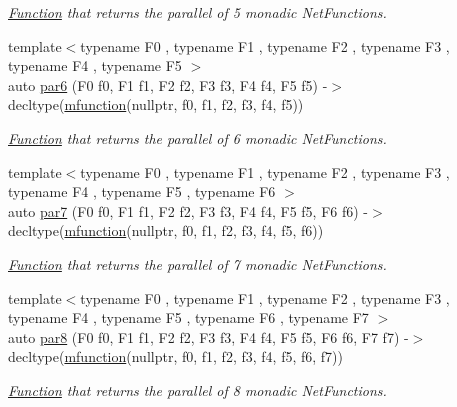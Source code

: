 \begin{DoxyCompactItemize}
\begin{DoxyCompactList}\small\item\em \hyperlink{structpfq_1_1lang_1_1Function}{Function} that returns the parallel of 5 monadic Net\+Functions. \end{DoxyCompactList}\item 
{\footnotesize template$<$typename F0 , typename F1 , typename F2 , typename F3 , typename F4 , typename F5 $>$ }\\auto \hyperlink{namespacepfq_1_1lang_1_1experimental_1_1anonymous__namespace_02experimental_8hpp_03_a01264553d41dccee4e8d1fe433f40270}{par6} (F0 f0, F1 f1, F2 f2, F3 f3, F4 f4, F5 f5) -\/$>$ decltype(\hyperlink{namespacepfq_1_1lang_a1aacba4a159b6c2ddf275bd1fec19ec2}{mfunction}(nullptr, f0, f1, f2, f3, f4, f5))
\begin{DoxyCompactList}\small\item\em \hyperlink{structpfq_1_1lang_1_1Function}{Function} that returns the parallel of 6 monadic Net\+Functions. \end{DoxyCompactList}\item 
{\footnotesize template$<$typename F0 , typename F1 , typename F2 , typename F3 , typename F4 , typename F5 , typename F6 $>$ }\\auto \hyperlink{namespacepfq_1_1lang_1_1experimental_1_1anonymous__namespace_02experimental_8hpp_03_a29db1f529be72b01366f8aa6cdea7cbd}{par7} (F0 f0, F1 f1, F2 f2, F3 f3, F4 f4, F5 f5, F6 f6) -\/$>$ decltype(\hyperlink{namespacepfq_1_1lang_a1aacba4a159b6c2ddf275bd1fec19ec2}{mfunction}(nullptr, f0, f1, f2, f3, f4, f5, f6))
\begin{DoxyCompactList}\small\item\em \hyperlink{structpfq_1_1lang_1_1Function}{Function} that returns the parallel of 7 monadic Net\+Functions. \end{DoxyCompactList}\item 
{\footnotesize template$<$typename F0 , typename F1 , typename F2 , typename F3 , typename F4 , typename F5 , typename F6 , typename F7 $>$ }\\auto \hyperlink{namespacepfq_1_1lang_1_1experimental_1_1anonymous__namespace_02experimental_8hpp_03_a65fa295cdb95a58b788ba6884ce44005}{par8} (F0 f0, F1 f1, F2 f2, F3 f3, F4 f4, F5 f5, F6 f6, F7 f7) -\/$>$ decltype(\hyperlink{namespacepfq_1_1lang_a1aacba4a159b6c2ddf275bd1fec19ec2}{mfunction}(nullptr, f0, f1, f2, f3, f4, f5, f6, f7))
\begin{DoxyCompactList}\small\item\em \hyperlink{structpfq_1_1lang_1_1Function}{Function} that returns the parallel of 8 monadic Net\+Functions. \end{DoxyCompactList}\end{DoxyCompactItemize}
